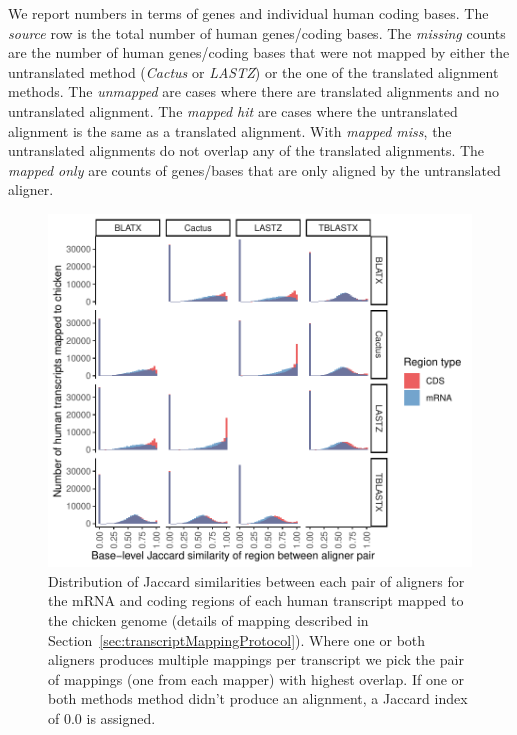 \documentclass{article}
\newcommand{\secref}[1]{Section~\ref{#1}}
\begin{document}
\begin{table}[!htb]
\begin{center}
{  %
  We report numbers in terms of genes and individual human coding bases. %
  The \textit{source} row is the total number of human genes/coding bases.  
  The \textit{missing} counts are the number of human genes/coding bases that were not mapped by either the untranslated method (\textit{Cactus} or \textit{LASTZ}) or the one of the translated alignment methods.  
  The \textit{unmapped} are cases where there are translated alignments and no untranslated alignment.  
  The \textit{mapped hit} are cases
  where the untranslated alignment is the same as a
  translated alignment.  
  With \textit{mapped miss}, the untranslated alignments do
  not overlap any of the translated alignments. 
  The \textit{mapped only} are
  counts of genes/bases that are only aligned by the untranslated aligner.
  }\label{tab:humanGeneCdsToAlignedCmp}
\end{center}
\end{table}

\begin{figure}
\begin{center}
\includegraphics[width=\textwidth]{transcript_cds_human_to_chicken_pairwise_jaccard_distributions.pdf}
\caption{Distribution of Jaccard similarities between each pair of aligners for the mRNA and coding regions of each human transcript mapped to the chicken genome (details of mapping described in \secref{sec:transcriptMappingProtocol}). Where one or both aligners produces multiple mappings per transcript we pick the pair of mappings (one from each mapper) with highest overlap. If one or both methods method didn't produce an
alignment, a Jaccard index of 0.0 is assigned.\label{fig:transcriptCDSJaccards}}
\end{center}
\end{figure}
\end{document}
